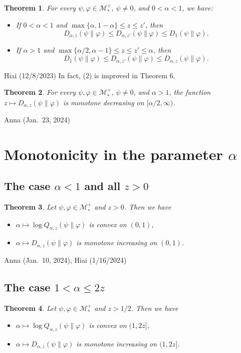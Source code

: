 \documentclass[12pt]{article}
\newtheorem{theorem}{Theorem}[section]
\theoremstyle{definition}
\theoremstyle{remark}
\numberwithin{equation}{section}
\def\Me{\mathcal M}
\def\ffi{\varphi}
\begin{document}
\begin{theorem}
For every $\psi,\ffi\in\Me_*^+$, $\psi\ne0$, and $0<\alpha<1$, we have:
\begin{itemize}
\item[(1)] If $0<\alpha<1$ and $\max\{\alpha,1-\alpha\}\le z\le z'$, then
\[
D_{\alpha,z}(\psi\|\ffi)\le D_{\alpha,z'}(\psi\|\ffi)\le D_1(\psi\|\ffi).
\]
\item[(2)] If $\alpha>1$ and $\max\{\alpha/2,\alpha-1\}\le z\le z'\le\alpha$, then
\[
D_1(\psi\|\ffi)\le D_{\alpha,z'}(\psi\|\ffi)\le D_{\alpha,z}(\psi\|\ffi).
\]
\end{itemize}
\end{theorem}
{\color{magenta}Hiai (12/8/2023)} {\color{blue}In fact, (2) is improved in Theorem 6.}

\begin{theorem}
For every $\psi,\ffi\in\Me_*^+$, $\psi\ne0$, and $\alpha>1$, the function $z\mapsto D_{\alpha,z}(\psi\|\varphi)$
is monotone decreasing on $[\alpha/2,\infty)$.
\end{theorem}
{\color{magenta}Anna (Jan.\ 23, 2024)}


\section{Monotonicity in the parameter $\alpha$}

\subsection{The case $\alpha<1$ and all $z>0$}

\begin{theorem}
Let $\psi,\ffi\in\Me_*^+$ and $z>0$. Then we have
\begin{itemize}
\item[(1)] $\alpha\mapsto\log Q_{\alpha,z}(\psi\|\ffi)$ is convex on $(0,1)$,
\item[(2)] $\alpha\mapsto D_{\alpha,z}(\psi\|\ffi)$ is monotone increasing on $(0,1)$.
\end{itemize}
\end{theorem}
{\color{magenta}Anna (Jan.\ 10, 2024), Hiai (1/16/2024)}

\subsection{The case $1<\alpha\le2z$}

\begin{theorem}
Let $\psi,\ffi\in\Me_*^+$ and $z>1/2$. Then we have
\begin{itemize}
\item[(1)] $\alpha\mapsto\log Q_{\alpha,z}(\psi\|\ffi)$ is convex on $(1,2z]$,
\item[(2)] $\alpha\mapsto D_{\alpha,z}(\psi\|\ffi)$ is monotone increasing on $(1,2z]$.
\end{itemize}
\end{theorem}
\end{document}
